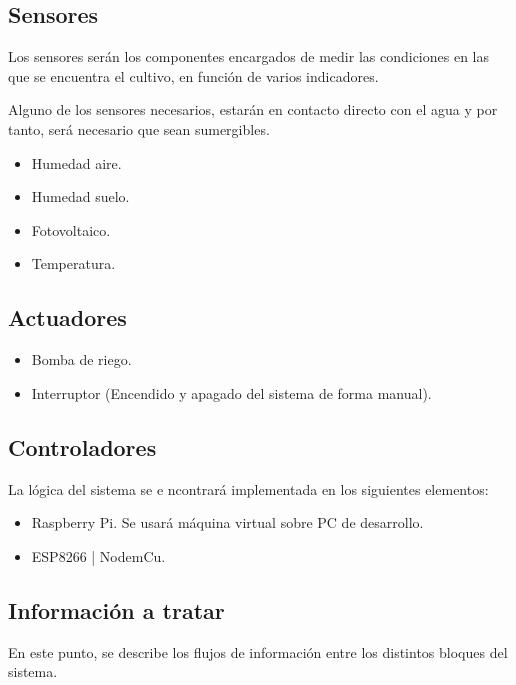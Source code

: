\documentclass[12pt,a4paper,titlepage,oneside]{report}
\begin{document}
	\subsection*{Sensores}
	Los sensores serán los componentes encargados de medir las condiciones en las que se encuentra el cultivo, en función de varios indicadores.

Alguno de los sensores necesarios, estarán en contacto directo con el agua y por tanto, será necesario que sean sumergibles.\cite{sensores}
		\begin{itemize}
			\item Humedad aire.
			\item Humedad suelo.
			\item Fotovoltaico.
			\item Temperatura.
		\end{itemize}

	\subsection*{Actuadores}

		\begin{itemize}
			\item Bomba de riego.
			\item Interruptor (Encendido y apagado del sistema de forma manual).
		\end{itemize}			
	
	\subsection*{Controladores}
	La lógica del sistema se e ncontrará implementada en los siguientes elementos:
		\begin{itemize}
			\item Raspberry Pi. Se usará máquina virtual sobre PC de desarrollo.
			\item ESP8266 | NodemCu.
		\end{itemize}			

	
	\subsection*{Información a tratar}
	En este punto, se describe los flujos de información entre los distintos bloques del sistema.
\end{document}
